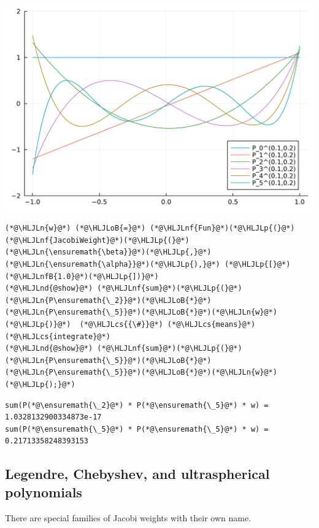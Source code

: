 \documentclass[12pt,a4paper]{article}
\newcommand{\HLJLn}[1]{#1}
\newcommand{\HLJLnd}[1]{\textcolor[RGB]{214,102,97}{#1}}
\newcommand{\HLJLnf}[1]{\textcolor[RGB]{66,102,213}{#1}}
\newcommand{\HLJLnfB}[1]{\textcolor[RGB]{59,151,46}{#1}}
\newcommand{\HLJLoB}[1]{\textcolor[RGB]{102,102,102}{\textbf{#1}}}
\newcommand{\HLJLp}[1]{#1}
\newcommand{\HLJLcs}[1]{\textcolor[RGB]{153,153,119}{\textit{#1}}}
\begin{document}
\includegraphics[width=\linewidth]{jl_dOthw0/OP_methods_12_1.pdf}

\begin{lstlisting}
(*@\HLJLn{w}@*) (*@\HLJLoB{=}@*) (*@\HLJLnf{Fun}@*)(*@\HLJLp{(}@*)(*@\HLJLnf{JacobiWeight}@*)(*@\HLJLp{(}@*)(*@\HLJLn{\ensuremath{\beta}}@*)(*@\HLJLp{,}@*)(*@\HLJLn{\ensuremath{\alpha}}@*)(*@\HLJLp{),}@*) (*@\HLJLp{[}@*)(*@\HLJLnfB{1.0}@*)(*@\HLJLp{])}@*)
(*@\HLJLnd{@show}@*) (*@\HLJLnf{sum}@*)(*@\HLJLp{(}@*)(*@\HLJLn{P\ensuremath{\_2}}@*)(*@\HLJLoB{*}@*)(*@\HLJLn{P\ensuremath{\_5}}@*)(*@\HLJLoB{*}@*)(*@\HLJLn{w}@*)(*@\HLJLp{)}@*)  (*@\HLJLcs{{\#}}@*) (*@\HLJLcs{means}@*) (*@\HLJLcs{integrate}@*)
(*@\HLJLnd{@show}@*) (*@\HLJLnf{sum}@*)(*@\HLJLp{(}@*)(*@\HLJLn{P\ensuremath{\_5}}@*)(*@\HLJLoB{*}@*)(*@\HLJLn{P\ensuremath{\_5}}@*)(*@\HLJLoB{*}@*)(*@\HLJLn{w}@*)(*@\HLJLp{);}@*)
\end{lstlisting}

\begin{lstlisting}
sum(P(*@\ensuremath{\_2}@*) * P(*@\ensuremath{\_5}@*) * w) = 1.0328132900334873e-17
sum(P(*@\ensuremath{\_5}@*) * P(*@\ensuremath{\_5}@*) * w) = 0.21713358248393153
\end{lstlisting}


\subsection{Legendre, Chebyshev, and ultraspherical polynomials}
There are special families of Jacobi weights with their own name.
\end{document}
